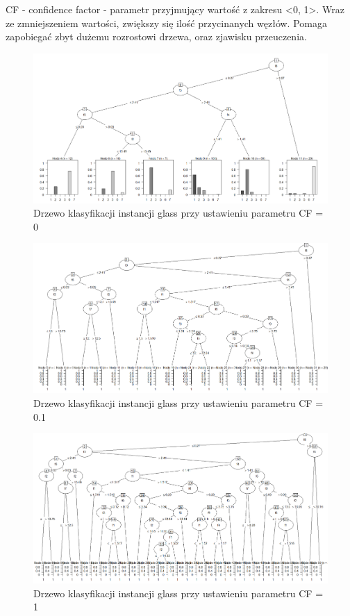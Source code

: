 \documentclass[12pt,a4paper]{article}
\begin{document}
CF - confidence factor - parametr przyjmujący wartość z zakresu <0, 1>. Wraz ze zmniejszeniem wartości, zwiększy się ilość przycinanych węzłów. Pomaga zapobiegać zbyt dużemu rozrostowi drzewa, oraz zjawisku przeuczenia.

\begin{figure}[H]
\centering
\includegraphics[width=1\textwidth]{glassCF_0.png}
\caption{Drzewo klasyfikacji instancji glass przy ustawieniu parametru CF = 0}
\end{figure}

\begin{figure}[H]
\centering
\includegraphics[width=1\textwidth]{glassCF_0_1.png}
\caption{Drzewo klasyfikacji instancji glass przy ustawieniu parametru CF = 0.1}
\end{figure}

\begin{figure}[H]
\centering
\includegraphics[width=1\textwidth]{glassCF_1.png}
\caption{Drzewo klasyfikacji instancji glass przy ustawieniu parametru CF = 1}
\end{figure}
\end{document}
